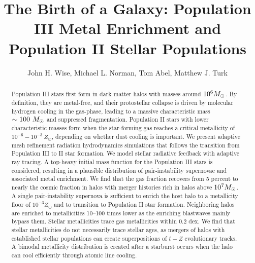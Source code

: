 \documentclass[apjl]{emulateapj}
\begin{document}

\title{The Birth of a Galaxy: Population III Metal Enrichment and
  Population II Stellar Populations}

\author{John H. Wise, 
  Michael L. Norman,
  Tom Abel,
  Matthew J. Turk}


\begin{abstract}

  Population III stars first form in dark matter halos with masses
  around $10^6 \Ms$.  By definition, they are metal-free, and their
  protostellar collapse is driven by molecular hydrogen cooling in the
  gas-phase, leading to a massive characteristic mass $\sim 100~\Ms$
  and suppressed fragmentation.  Population II stars with lower
  characteristic masses form when the star-forming gas reaches a
  critical metallicity of $10^{-6} - 10^{-3}~Z_\odot$, depending on
  whether dust cooling is important.  We present adaptive mesh
  refinement radiation hydrodynamics simulations that follows the
  transition from Population III to II star formation.  We model
  stellar radiative feedback with adaptive ray tracing.  A top-heavy
  initial mass function for the Population III stars is considered,
  resulting in a plausible distribution of pair-instability supernovae
  and associated metal enrichment.  We find that the gas fraction
  recovers from 5 percent to nearly the cosmic fraction in halos with
  merger histories rich in halos above $10^7 \Ms$.  A single
  pair-instability supernova is sufficient to enrich the host halo to
  a metallicity floor of $10^{-3} Z_\odot$ and to transition to
  Population II star formation.  Neighboring halos are enriched to
  metallicities 10--100 times lower as the enriching blastwaves mainly
  bypass them.  Stellar metallicities trace gas metallicities within
  0.2 dex.  We find that stellar metallicities do not necessarily
  trace stellar ages, as mergers of halos with established stellar
  populations can create superpositions of $t-Z$ evolutionary tracks.
  A bimodal metallicity distribution is created after a starburst
  occurs when the halo can cool efficiently through atomic line
  cooling.

\end{abstract}
\end{document}
